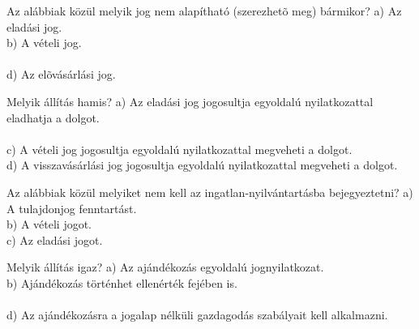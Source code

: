\begin{frame}


\begin{tcolorbox}[title={168. Kérdés}]
Az alábbiak közül melyik jog nem alapítható (szerezhetõ meg) bármikor?
\tcblower
a) Az eladási jog.\\
b) A vételi jog.\\
\\
d) Az elõvásárlási jog.
\end{tcolorbox}

\begin{tcolorbox}[title={169. Kérdés}]
Melyik állítás hamis?
\tcblower
a) Az eladási jog jogosultja egyoldalú nyilatkozattal eladhatja a dolgot.\\
\\
c) A vételi jog jogosultja egyoldalú nyilatkozattal megveheti a dolgot.\\
d) A visszavásárlási jog jogosultja egyoldalú nyilatkozattal megveheti a dolgot.
\end{tcolorbox}

\begin{tcolorbox}[title={170. Kérdés}]
Az alábbiak közül melyiket nem kell az ingatlan-nyilvántartásba bejegyeztetni?
\tcblower
a) A tulajdonjog fenntartást.\\
b) A vételi jogot.\\
c) Az eladási jogot.\\
\end{tcolorbox}

\begin{tcolorbox}[title={171. Kérdés}]
Melyik állítás igaz?
\tcblower
a) Az ajándékozás egyoldalú jognyilatkozat.\\
b) Ajándékozás történhet ellenérték fejében is.\\
\\
d) Az ajándékozásra a jogalap nélküli gazdagodás szabályait kell alkalmazni.
\end{tcolorbox}

\end{frame}


